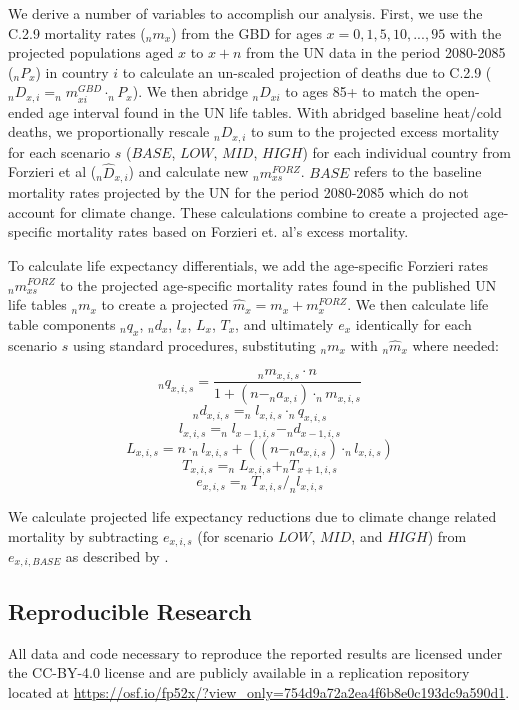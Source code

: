 \documentclass[12pt]{article}
\begin{document}
We derive a number of variables to accomplish our analysis. First, we
use the C.2.9 mortality rates (\(_nm_x\)) from the GBD for ages
\(x=0,1,5,10,...,95\) with the projected populations aged \(x\) to
\(x+n\) from the UN data in the period 2080-2085 (\(_nP_x\)) in country
\(i\) to calculate an un-scaled projection of deaths due to C.2.9
(\(_nD_{x,i}=_nm_{xi}^{GBD} \cdot _nP_x\)). We then abridge \(_nD_{xi}\)
to ages 85+ to match the open-ended age interval found in the UN life
tables. With abridged baseline heat/cold deaths, we proportionally
rescale \(_nD_{x,i}\) to sum to the projected excess mortality for each
scenario \(s\) (\(BASE\), \(LOW\), \(MID\), \(HIGH\)) for each
individual country from Forzieri et al \citep{forzieri2017increasing}
(\(_n\hat{D}_{x,i}\)) and calculate new \(_nm_{xs}^{FORZ}\). \(BASE\)
refers to the baseline mortality rates projected by the UN for the
period 2080-2085 which do not account for climate change. These
calculations combine to create a projected age-specific mortality rates
based on Forzieri et. al's excess mortality.

To calculate life expectancy differentials, we add the age-specific
Forzieri rates \(_nm_{xs}^{FORZ}\) to the projected age-specific
mortality rates found in the published UN life tables \(_nm_x\) to
create a projected \(\hat{m}_x=m_x + m_x^{FORZ}\). We then calculate
life table components \(_nq_x\), \(_nd_x\), \(l_x\), \(L_x\), \(T_x\),
and ultimately \(e_x\) identically for each scenario \(s\) using
standard procedures, substituting \(_nm_x\) with \(_n\hat{m}_x\) where
needed:

\[_nq_{x,i,s} = \frac{_nm_{x,i,s}\cdot  n}{1+(n-_na_{x,i}) \cdot _nm_{x,i,s}}\]
\[_nd_{x,i,s} = _nl_{x,i,s} \cdot _nq_{x,i,s}\]
\[l_{x,i,s} = _nl_{x-1,i,s} - _nd_{x-1,i,s}\]
\[L_{x,i,s} = n \cdot _nl_{x,i,s} + ((n-_na_{x,i,s}) \cdot _nl_{x,i,s})\]
\[T_{x,i,s} = _nL_{x,i,s} + _nT_{x+1,i,s}\]
\[e_{x,i,s} = _nT_{x,i,s} / _nl_{x,i,s}\]

We calculate projected life expectancy reductions due to climate change
related mortality by subtracting \(e_{x,i,s}\) (for scenario \(LOW\),
\(MID\), and \(HIGH\)) from \(e_{x,i,BASE}\) as described by
\citep{beltran2008integrated}.

\subsection{Reproducible Research}\label{reproducible-research}

All data and code necessary to reproduce the reported results are
licensed under the CC-BY-4.0 license and are publicly available in a
replication repository located at
\url{https://osf.io/fp52x/?view_only=754d9a72a2ea4f6b8e0c193dc9a590d1}.
\end{document}
